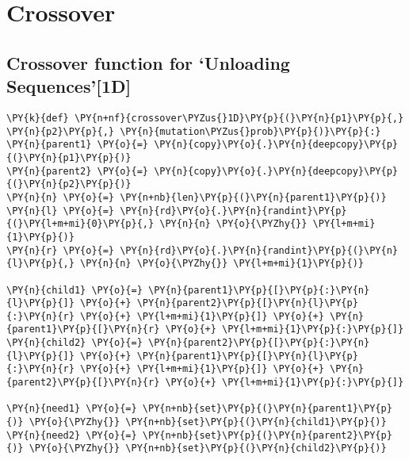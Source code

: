 \section*{Crossover}\label{crossover}

\subsection*{Crossover function for `Unloading
Sequences'{[}1D{]}}\label{crossover-function-for-unloading-sequences1d}

\begin{tcolorbox}[breakable, size=fbox, boxrule=1pt, pad at break*=1mm,colback=cellbackground, colframe=cellborder]
\begin{Verbatim}[commandchars=\\\{\}]
\PY{k}{def} \PY{n+nf}{crossover\PYZus{}1D}\PY{p}{(}\PY{n}{p1}\PY{p}{,} \PY{n}{p2}\PY{p}{,} \PY{n}{mutation\PYZus{}prob}\PY{p}{)}\PY{p}{:}
\PY{n}{parent1} \PY{o}{=} \PY{n}{copy}\PY{o}{.}\PY{n}{deepcopy}\PY{p}{(}\PY{n}{p1}\PY{p}{)}
\PY{n}{parent2} \PY{o}{=} \PY{n}{copy}\PY{o}{.}\PY{n}{deepcopy}\PY{p}{(}\PY{n}{p2}\PY{p}{)}
\PY{n}{n} \PY{o}{=} \PY{n+nb}{len}\PY{p}{(}\PY{n}{parent1}\PY{p}{)}
\PY{n}{l} \PY{o}{=} \PY{n}{rd}\PY{o}{.}\PY{n}{randint}\PY{p}{(}\PY{l+m+mi}{0}\PY{p}{,} \PY{n}{n} \PY{o}{\PYZhy{}} \PY{l+m+mi}{1}\PY{p}{)}
\PY{n}{r} \PY{o}{=} \PY{n}{rd}\PY{o}{.}\PY{n}{randint}\PY{p}{(}\PY{n}{l}\PY{p}{,} \PY{n}{n} \PY{o}{\PYZhy{}} \PY{l+m+mi}{1}\PY{p}{)}

\PY{n}{child1} \PY{o}{=} \PY{n}{parent1}\PY{p}{[}\PY{p}{:}\PY{n}{l}\PY{p}{]} \PY{o}{+} \PY{n}{parent2}\PY{p}{[}\PY{n}{l}\PY{p}{:}\PY{n}{r} \PY{o}{+} \PY{l+m+mi}{1}\PY{p}{]} \PY{o}{+} \PY{n}{parent1}\PY{p}{[}\PY{n}{r} \PY{o}{+} \PY{l+m+mi}{1}\PY{p}{:}\PY{p}{]}
\PY{n}{child2} \PY{o}{=} \PY{n}{parent2}\PY{p}{[}\PY{p}{:}\PY{n}{l}\PY{p}{]} \PY{o}{+} \PY{n}{parent1}\PY{p}{[}\PY{n}{l}\PY{p}{:}\PY{n}{r} \PY{o}{+} \PY{l+m+mi}{1}\PY{p}{]} \PY{o}{+} \PY{n}{parent2}\PY{p}{[}\PY{n}{r} \PY{o}{+} \PY{l+m+mi}{1}\PY{p}{:}\PY{p}{]}

\PY{n}{need1} \PY{o}{=} \PY{n+nb}{set}\PY{p}{(}\PY{n}{parent1}\PY{p}{)} \PY{o}{\PYZhy{}} \PY{n+nb}{set}\PY{p}{(}\PY{n}{child1}\PY{p}{)}
\PY{n}{need2} \PY{o}{=} \PY{n+nb}{set}\PY{p}{(}\PY{n}{parent2}\PY{p}{)} \PY{o}{\PYZhy{}} \PY{n+nb}{set}\PY{p}{(}\PY{n}{child2}\PY{p}{)}


\end{Verbatim}
\end{tcolorbox}
